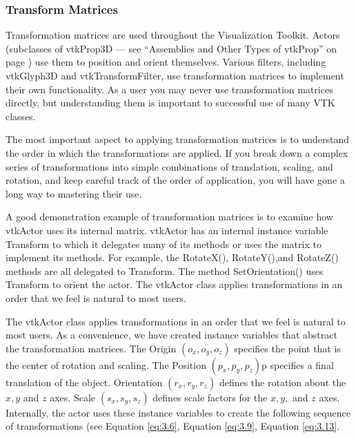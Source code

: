 \subsubsection{Transform Matrices}
\label{subsubsec:transform_matrices}

Transformation matrices are used throughout the  Visualization Toolkit. Actors (subclasses of vtkProp3D --- see ``Assemblies and Other Types of vtkProp'' on page \pageref{subsubsec:assemblies_vtkprop} ) use them to position and orient themselves. Various filters, including vtkGlyph3D and vtkTransformFilter, use transformation matrices to implement their own functionality. As a user you may never use transformation matrices directly, but understanding them is important to successful use of many VTK classes.

The most important aspect to applying transformation matrices is to understand the order in which the transformations are applied. If you break down a complex series of transformations into simple combinations of translation, scaling, and rotation, and keep careful track of the order of application, you will have gone a long way to mastering their use.

A good demonstration example of transformation matrices is to examine how vtkActor uses its internal matrix. vtkActor has an internal instance variable Transform to which it delegates many of its methods or uses the matrix to implement its methods. For example, the RotateX(), RotateY(),and RotateZ() methods are all delegated to Transform. The method SetOrientation() uses Transform to orient the actor. The vtkActor class applies transformations in an order that we feel is natural to most users.

The vtkActor class applies transformations in an order that we feel is natural to most users. As a convenience, we have created instance variables that abstract the transformation matrices. The Origin $(o_x,o_y,o_z)$ specifies the point that is the center of rotation and scaling. The Position $(p_x, p_y, p_z)$p specifies a final translation of the object. Orientation $(r_x, r_y, r_z)$ defines the rotation about the $x, y$ and $z$ axes. Scale $(s_x, s_y, s_z)$ defines scale factors for the $x, y,$ and $z$ axes. Internally, the actor uses these instance variables to create the following sequence of transformations (see Equation \eqref{eq:3.6}, Equation \eqref{eq:3.9},  Equation \eqref{eq:3.13}.

